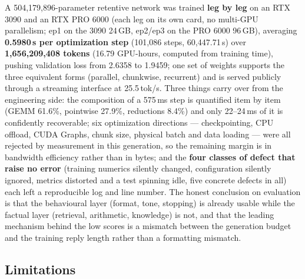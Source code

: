 A 504{,}179{,}896-parameter retentive network was trained \textbf{leg by leg} on an RTX 3090 and an
RTX PRO 6000 (each leg on its own card, no multi-GPU parallelism; ep1 on the 3090 24\,GB, ep2/ep3
on the PRO 6000 96\,GB), averaging \textbf{0.5980\,s per optimization step} (101{,}086 steps,
60{,}447.71\,s) over \textbf{1{,}656{,}209{,}408 tokens} (16.79 GPU-hours,  computed
from training time), pushing validation loss from 2.6358 to 1.9459; one set of weights supports
the three equivalent forms (parallel, chunkwise, recurrent) and is served publicly through a
streaming interface at 25.5\,tok/s. Three things carry over from the engineering side: the
composition of a 575\,ms step is quantified item by item (GEMM 61.6\%, pointwise 27.9\%,
reductions 8.4\%) and only 22--24\,ms of it is confidently recoverable; six optimization
directions --- checkpointing, CPU offload, CUDA Graphs, chunk size, physical batch and data
loading --- were all rejected by measurement in this generation, so the remaining margin is in
bandwidth efficiency rather than in bytes; and the \textbf{four classes of defect that raise no
error} (training numerics silently changed, configuration silently ignored, metrics distorted and
a test spinning idle, five concrete defects in all) each left a reproducible log and line number.
The honest conclusion on evaluation is that the behavioural layer (format, tone, stopping) is
already usable while the factual layer (retrieval, arithmetic, knowledge) is not, and that the
leading mechanism behind the low scores is a mismatch between the generation budget and the
training reply length rather than a formatting mismatch.

\subsection{Limitations}

